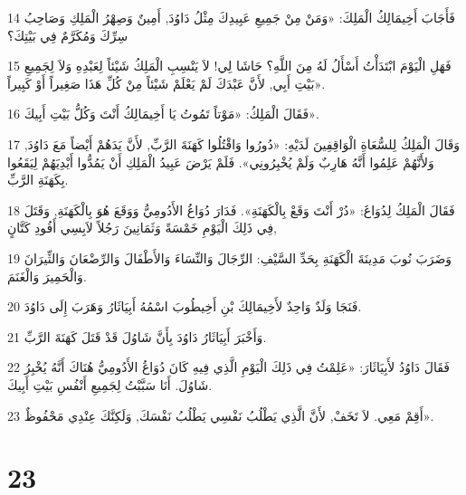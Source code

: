 \par 14 فَأَجَابَ أَخِيمَالِكُ الْمَلِكَ: «وَمَنْ مِنْ جَمِيعِ عَبِيدِكَ مِثْلُ دَاوُدَ, أَمِينٌ وَصِهْرُ الْمَلِكِ وَصَاحِبُ سِرِّكَ وَمُكَرَّمٌ فِي بَيْتِكَ؟
\par 15 فَهَلِ الْيَوْمَ ابْتَدَأْتُ أَسْأَلُ لَهُ مِنَ اللَّهِ؟ حَاشَا لِي! لاَ يَنْسِبِ الْمَلِكُ شَيْئاً لِعَبْدِهِ وَلاَ لِجَمِيعِ بَيْتِ أَبِي, لأَنَّ عَبْدَكَ لَمْ يَعْلَمْ شَيْئاً مِنْ كُلِّ هَذَا صَغِيراً أَوْ كَبِيراً».
\par 16 فَقَالَ الْمَلِكُ: «مَوْتاً تَمُوتُ يَا أَخِيمَالِكُ أَنْتَ وَكُلُّ بَيْتِ أَبِيكَ».
\par 17 وَقَالَ الْمَلِكُ لِلسُّعَاةِ الْوَاقِفِينَ لَدَيْهِ: «دُورُوا وَاقْتُلُوا كَهَنَةَ الرَّبِّ, لأَنَّ يَدَهُمْ أَيْضاً مَعَ دَاوُدَ, وَلأَنَّهُمْ عَلِمُوا أَنَّهُ هَارِبٌ وَلَمْ يُخْبِرُونِي». فَلَمْ يَرْضَ عَبِيدُ الْمَلِكِ أَنْ يَمُدُّوا أَيْدِيَهُمْ لِيَقَعُوا بِكَهَنَةِ الرَّبِّ.
\par 18 فَقَالَ الْمَلِكُ لِدُوَاغَ: «دُرْ أَنْتَ وَقَعْ بِالْكَهَنَةِ». فَدَارَ دُوَاغُ الأَدُومِيُّ وَوَقَعَ هُوَ بِالْكَهَنَةِ, وَقَتَلَ فِي ذَلِكَ الْيَوْمِ خَمْسَةً وَثَمَانِينَ رَجُلاً لاَبِسِي أَفُودِ كَتَّانٍ,
\par 19 وَضَرَبَ نُوبَ مَدِينَةَ الْكَهَنَةِ بِحَدِّ السَّيْفِ: الرِّجَالَ وَالنِّسَاءَ وَالأَطْفَالَ وَالرِّضْعَانَ وَالثِّيرَانَ وَالْحَمِيرَ وَالْغَنَمَ.
\par 20 فَنَجَا وَلَدٌ وَاحِدٌ لأَخِيمَالِكَ بْنِ أَخِيطُوبَ اسْمُهُ أَبِيَاثَارُ وَهَرَبَ إِلَى دَاوُدَ.
\par 21 وَأَخْبَرَ أَبِيَاثَارُ دَاوُدَ بِأَنَّ شَاوُلَ قَدْ قَتَلَ كَهَنَةَ الرَّبِّ.
\par 22 فَقَالَ دَاوُدُ لأَبِيَاثَارَ: «عَلِمْتُ فِي ذَلِكَ الْيَوْمِ الَّذِي فِيهِ كَانَ دُوَاغُ الأَدُومِيُّ هُنَاكَ أَنَّهُ يُخْبِرُ شَاوُلَ. أَنَا سَبَّبْتُ لِجَمِيعِ أَنْفُسِ بَيْتِ أَبِيكَ.
\par 23 أَقِمْ مَعِي. لاَ تَخَفْ, لأَنَّ الَّذِي يَطْلُبُ نَفْسِي يَطْلُبُ نَفْسَكَ, وَلَكِنَّكَ عِنْدِي مَحْفُوظٌ».

\chapter{23}

